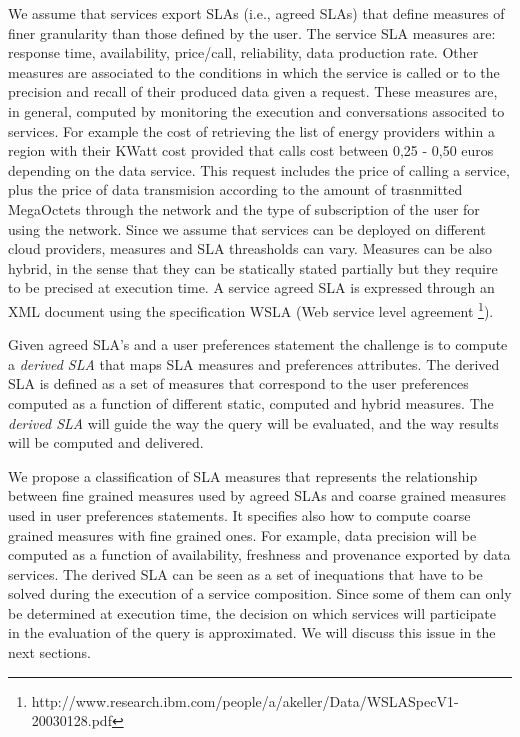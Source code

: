 
We assume that services export SLAs (i.e., agreed SLAs) that define measures  of finer granularity than those defined by the user.  The service SLA measures  are: response time, availability, price/call, reliability, data production rate. Other measures are associated to the conditions in which the service is called or to the precision and recall of their produced data given a request. These measures are, in general, computed by monitoring the execution and conversations associted to services. For example the cost of retrieving the list of energy providers within a region with their KWatt cost provided that calls cost between 0,25 - 0,50 euros depending on the data service. This request  includes the price of calling a service, plus the price of data transmision according to the amount of trasnmitted MegaOctets through the network and the type of subscription of the user for using the network. Since we assume that services can be deployed on different cloud providers, measures and SLA threasholds can vary.
 Measures can be also hybrid, in the sense that they can be statically stated partially but they require to be precised at execution time.  A service  agreed SLA is expressed through an  XML document using the specification WSLA (Web service level agreement \footnote{\footnotesize http://www.research.ibm.com/people/a/akeller/\-Data/WSLASpecV1-20030128.pdf}).


Given agreed SLA's and a user preferences statement the challenge is to compute a  {\em derived SLA} that  maps SLA measures and preferences attributes.  The derived SLA is defined as a set of measures that correspond to the user preferences computed as a function of different static, computed and hybrid measures. The {\em derived SLA}  will guide the way the query will be evaluated, and the way results will be computed and delivered.

 We propose a classification of SLA measures that represents the relationship between fine grained measures used by agreed SLAs and coarse grained measures used in user preferences statements. It specifies also how to compute coarse grained measures with fine grained ones. For example, data precision will be computed as a function of availability, freshness and provenance exported by data services. The derived SLA  can be seen as a set of inequations that have to be solved during the execution of a service composition. Since some of them can only be determined at execution time, the decision on which services will participate in the evaluation of the query is approximated. We will discuss this issue in the next sections.


